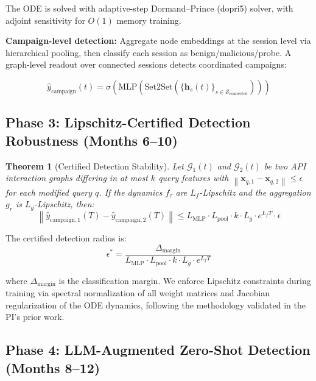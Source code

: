 \documentclass[12pt,a4paper]{article}
\newtheorem{theorem}{Theorem}
\newcommand{\calG}{\mathcal{G}}
\newcommand{\norm}[1]{\left\|#1\right\|}
\begin{document}
The ODE is solved with adaptive-step Dormand--Prince (dopri5) solver, with adjoint sensitivity for $O(1)$ memory training.

\textbf{Campaign-level detection:} Aggregate node embeddings at the session level via hierarchical pooling, then classify each session as benign/malicious/probe. A graph-level readout over connected sessions detects coordinated campaigns:

\begin{equation}
    \hat{y}_{\text{campaign}}(t) = \sigma\left(\text{MLP}\left(\text{Set2Set}\left(\{\mathbf{h}_s(t)\}_{s \in \mathcal{S}_{\text{connected}}}\right)\right)\right)
\end{equation}

\subsection{Phase 3: Lipschitz-Certified Detection Robustness (Months 6--10)}

\begin{theorem}[Certified Detection Stability]
Let $\calG_1(t)$ and $\calG_2(t)$ be two API interaction graphs differing in at most $k$ query features with $\norm{\mathbf{x}_{q,1} - \mathbf{x}_{q,2}} \leq \epsilon$ for each modified query $q$. If the dynamics $f_{\tau}$ are $L_f$-Lipschitz and the aggregation $g_r$ is $L_g$-Lipschitz, then:
\begin{equation}
    \norm{\hat{y}_{\text{campaign},1}(T) - \hat{y}_{\text{campaign},2}(T)} \leq L_{\text{MLP}} \cdot L_{\text{pool}} \cdot k \cdot L_g \cdot e^{L_f T} \cdot \epsilon
\end{equation}
\end{theorem}

The certified detection radius is:
\begin{equation}
    \epsilon^* = \frac{\Delta_{\text{margin}}}{L_{\text{MLP}} \cdot L_{\text{pool}} \cdot k \cdot L_g \cdot e^{L_f T}}
\end{equation}

where $\Delta_{\text{margin}}$ is the classification margin. We enforce Lipschitz constraints during training via spectral normalization of all weight matrices and Jacobian regularization of the ODE dynamics, following the methodology validated in the PI's prior work.

\subsection{Phase 4: LLM-Augmented Zero-Shot Detection (Months 8--12)}
\end{document}
